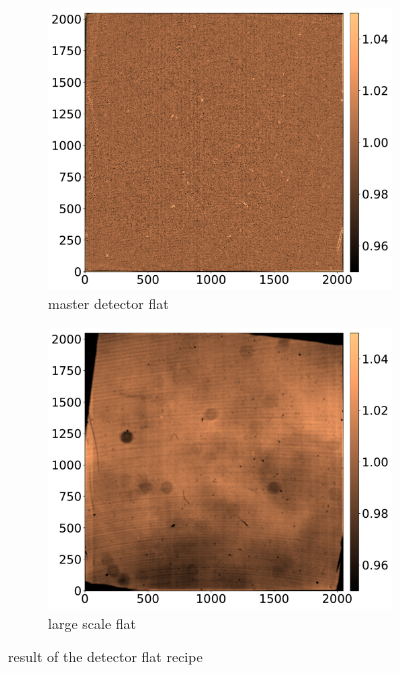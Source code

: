 \documentclass[twoside,single]{lion-msc}
\begin{document}
\begin{figure}[hb]
\centering
\begin{subfigure}{.48\textwidth}
  \centering
  \includegraphics[width=1\linewidth]{masterdetectorflat}
  \caption{master detector flat}
  \label{fig:masterdetectorflat}
\end{subfigure}\hfill
\begin{subfigure}{.48\textwidth}
  \centering
  \includegraphics[width=1\linewidth]{largescaleflat}
  \caption{large scale flat}
  \label{fig:largescaleflat}
\end{subfigure}
\caption{result of the detector flat recipe}
\end{figure}
\end{document}
